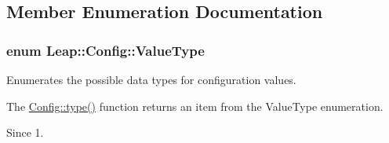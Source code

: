 \subsection{Member Enumeration Documentation}
\hypertarget{class_leap_1_1_config_aee9819af7eacacc324aa72619310a9d8}{
\subsubsection[{Value\+Type}]{\setlength{\rightskip}{0pt plus 5cm}enum {\bf Leap\+::\+Config\+::\+Value\+Type}}}\label{class_leap_1_1_config_aee9819af7eacacc324aa72619310a9d8}
Enumerates the possible data types for configuration values.

The \hyperlink{class_leap_1_1_config_ac5ed7b7b0562cc4dae2d0b4ab8187b12}{Config\+::type()} function returns an item from the Value\+Type enumeration. \begin{DoxySince}{Since}
1. 
\end{DoxySince}
